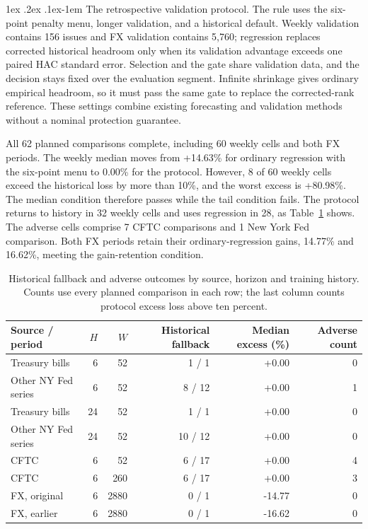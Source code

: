 \documentclass[10pt,a4paper]{article}
\makeatletter
\renewcommand\paragraph{\@startsection{paragraph}{4}{\z@}%
  {1ex \@plus .2ex \@minus .1ex}{-1em}%
  {\normalfont\normalsize\bfseries}}
\makeatother
\begin{document}
\FloatBarrier
\paragraph{The retrospective validation protocol.}
The rule uses the six-point penalty menu, longer validation, and a historical default. Weekly validation contains 156 issues and FX validation contains 5,760; regression replaces corrected historical headroom only when its validation advantage exceeds one paired HAC standard error. Selection and the gate share validation data, and the decision stays fixed over the evaluation segment. Infinite shrinkage gives ordinary empirical headroom, so it must pass the same gate to replace the corrected-rank reference. These settings combine existing forecasting and validation methods without a nominal protection guarantee.

All 62 planned comparisons complete, including 60 weekly cells and both FX periods. The weekly median moves from +14.63\% for ordinary regression with the six-point menu to 0.00\% for the protocol. However, 8 of 60 weekly cells exceed the historical loss by more than 10\%, and the worst excess is +80.98\%. The median condition therefore passes while the tail condition fails. The protocol returns to history in 32 weekly cells and uses regression in 28, as Table~\ref{tab:v13-routing} shows. The adverse cells comprise 7 CFTC comparisons and 1 New York Fed comparison. Both FX periods retain their ordinary-regression gains, 14.77\% and 16.62\%, meeting the gain-retention condition.

\begin{table}[!htbp]\centering\footnotesize\setlength{\tabcolsep}{4pt}
\caption{Historical fallback and adverse outcomes by source, horizon and training history. Counts use every planned comparison in each row; the last column counts protocol excess loss above ten percent.}\label{tab:v13-routing}
\begin{tabular}{lrrr rr}\toprule
Source / period & $H$ & $W$ & Historical fallback & Median excess (\%) & Adverse count\\\midrule
Treasury bills & 6 & 52 & 1 / 1 & +0.00 & 0 \\
Other NY Fed series & 6 & 52 & 8 / 12 & +0.00 & 1 \\
Treasury bills & 24 & 52 & 1 / 1 & +0.00 & 0 \\
Other NY Fed series & 24 & 52 & 10 / 12 & +0.00 & 0 \\
CFTC & 6 & 52 & 6 / 17 & +0.00 & 4 \\
CFTC & 6 & 260 & 6 / 17 & +0.00 & 3 \\
FX, original & 6 & 2880 & 0 / 1 & -14.77 & 0 \\
FX, earlier & 6 & 2880 & 0 / 1 & -16.62 & 0 \\
\bottomrule\end{tabular}
\end{table}
\end{document}
